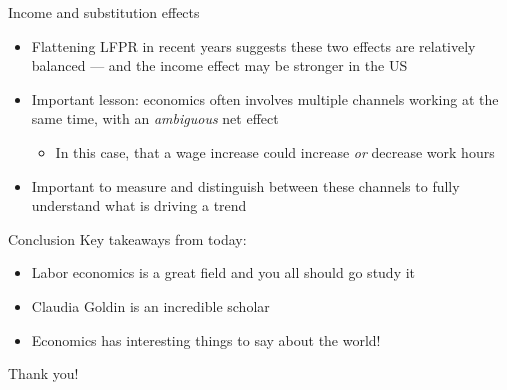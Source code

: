 \documentclass[aspectratio=169]{beamer}
\begin{document}
\begin{frame}{Income and substitution effects}
    \begin{itemize}
        \item Flattening LFPR in recent years suggests these two effects are relatively balanced --- and the income effect may be stronger in the US
        \item Important lesson: economics often involves multiple channels working at the same time, with an \textit{ambiguous} net effect
        \begin{itemize}
            \item In this case, that a wage increase could increase \textit{or} decrease work hours
        \end{itemize}
        \item Important to measure and distinguish between these channels to fully understand what is driving a trend
    \end{itemize}
\end{frame}

\begin{frame}{Conclusion}
    Key takeaways from today:
    \begin{itemize}
        \item Labor economics is a great field and you all should go study it
        \item Claudia Goldin is an incredible scholar
        \item Economics has interesting things to say about the world!
    \end{itemize}

    \vspace{5mm}
    
    \centering
    \large
    Thank you!

\end{frame}
\end{document}
